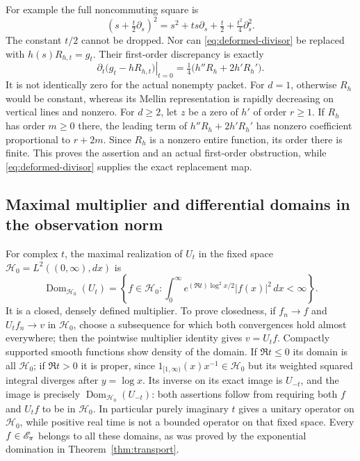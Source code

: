 \documentclass[11pt]{article}
\begin{document}
For example the full noncommuting square is
\begin{equation}\label{eq:noncommuting-square}
\left(s+\tfrac t2\partial_s\right)^2
=s^2+t s\partial_s+\tfrac t2+\tfrac{t^2}{4}\partial_s^2.
\end{equation}
The constant $t/2$ cannot be dropped. Nor can
\eqref{eq:deformed-divisor} be replaced with $h(s)R_{h,t}=g_t$.
Their first-order discrepancy is exactly
\begin{equation}\label{eq:discrepancy}
\left.\partial_t\bigl(g_t-hR_{h,t}\bigr)\right|_{t=0}
=\tfrac14\bigl(h''R_h+2h'R_h'\bigr).
\end{equation}
It is not identically zero for the actual nonempty packet.
For $d=1$, otherwise $R_h$ would be constant, whereas its Mellin
representation is rapidly decreasing on vertical lines and nonzero.
For $d\geq2$, let $z$ be a zero of $h'$ of order $r\geq1$.
If $R_h$ has order $m\geq0$ there, the leading term of
$h''R_h+2h'R_h'$ has nonzero coefficient proportional to $r+2m$.
Since $R_h$ is a nonzero entire function, its order there is finite.
This proves the assertion and an actual first-order obstruction,
while \eqref{eq:deformed-divisor} supplies the exact replacement map.

\subsection{Maximal multiplier and differential domains in the observation norm}
For complex $t$, the maximal realization of $U_t$ in the fixed
space $\mathcal H_0=L^2((0,\infty),dx)$ is
\begin{equation}\label{eq:maximal-multiplier}
\operatorname{Dom}_{\mathcal H_0}(U_t)=
\left\{f\in\mathcal H_0:\int_0^\infty
e^{(\Re t)\log^2x/2}|f(x)|^2\,dx<\infty\right\}.
\end{equation}
It is a closed, densely defined multiplier. To prove closedness,
if $f_n\to f$ and $U_tf_n\to v$ in $\mathcal H_0$, choose a subsequence
for which both convergences hold almost everywhere; then the
pointwise multiplier identity gives $v=U_tf$. Compactly supported
smooth functions show density of the domain. If $\Re t\leq0$ its
domain is all $\mathcal H_0$; if $\Re t>0$ it is proper, since
$1_{[1,\infty)}(x)x^{-1}\in\mathcal H_0$ but its weighted squared integral
diverges after $y=\log x$. Its inverse on its exact image is $U_{-t}$,
and the image is precisely $\operatorname{Dom}_{\mathcal H_0}(U_{-t})$:
both assertions follow from requiring both $f$ and $U_tf$ to be in
$\mathcal H_0$. In particular purely imaginary $t$ gives a unitary operator
on $\mathcal H_0$, while positive real time is not a bounded operator on
that fixed space. Every $f\in\mathscr E_\pi$ belongs to all these domains,
as was proved by the exponential domination in
Theorem~\ref{thm:transport}.
\end{document}
